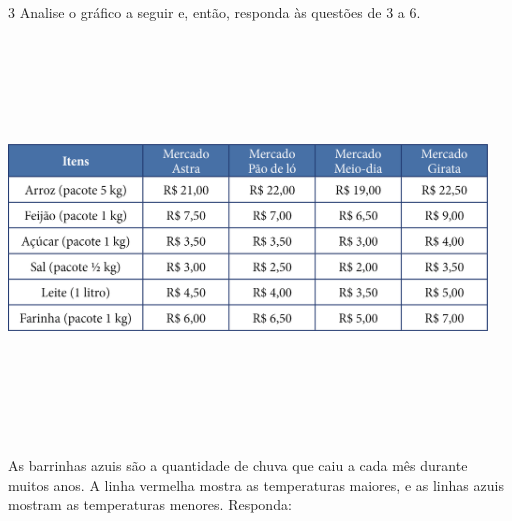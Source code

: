 
\num{3} Analise o gráfico a seguir e, então, responda às questões de 3 a 6.


\includegraphics[width=5.00000in,height=4.17708in]{media/image92.png}

As barrinhas azuis são a quantidade de chuva que caiu a cada mês durante
muitos anos. A linha vermelha mostra as temperaturas maiores, e as
linhas azuis mostram as temperaturas menores. Responda:

